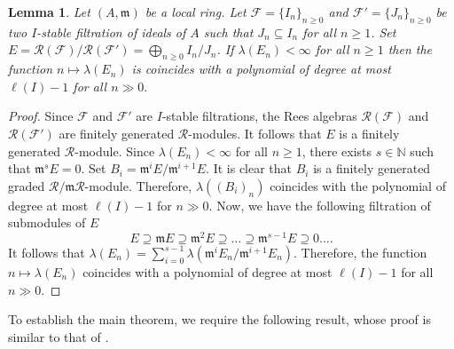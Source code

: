 \documentclass[11pt]{amsart}
\theoremstyle{plain}
\newtheorem{lemma}[theorem]{Lemma}
\newcommand{\m}{\mathfrak{m}}
\newcommand{\R}{\mathcal{R}}
\newcommand{\F}{\mathcal{F}}
\newcommand{\N}{\mathbb{N}}
\theoremstyle{plain}
\begin{document}
\begin{lemma}
\label{Thm:upperbound}
\normalfont
Let $(A,\m)$ be a local ring. Let $\F=\{I_n\}_{n\geq 0}$ and $\F'=\{J_n\}_{n\geq 0}$ be two $I$-stable filtration of ideals of $A$ such that $J_n\subseteq I_n$ for all $n\geq 1$. Set $E=\R(\F)/\R{(\F')}=\bigoplus_{n\geq 0}I_n/J_n$. If $\lambda(E_n)<\infty$ for all $n\geq 1$ then the function $n\mapsto \lambda(E_n)$ is coincides with a polynomial of degree at most $\ell(I)- 1$ for all $n\gg0.$
\end{lemma}
\begin{proof}
   Since $\F$ and $\F'$ are $I$-stable filtrations, the Rees algebras $\R(\F)$ and $\R(\F')$ are finitely generated $\R$-modules. It follows that $E$ is a finitely generated $\R$-module. Since $\lambda(E_n)<\infty$ for all $n \geq 1$, there exists $s\in \N$ such that $\m^sE=0.$ Set $B_i=\m^iE/\m^{i+1}E$. It is clear that $B_i$ is a finitely generated graded $\R/\m \R$-module. Therefore, $\lambda((B_i)_n)$ coincides with the polynomial of degree at most $\ell(I)-1$ for $n\gg0.$ Now, we have the following filtration of submodules of $E$ $$E\supseteq \m E\supseteq \m^2 E \supseteq \ldots \supseteq \m^{s-1} E\supseteq 0 \ldots.$$ It follows that $\lambda(E_n)=\sum_{i=0}^{s-1}\lambda(\m^iE_n/\m^{i+1}E_n)$. Therefore, the function $n\mapsto \lambda(E_n)$ coincides with a polynomial of degree at most $ \ell(I)-1$ for all $n\gg0.$
    \end{proof}

To establish the main theorem, we require the following result, whose proof is similar to that of \cite[Proposition 5.6]{tonytrans}.
\end{document}
